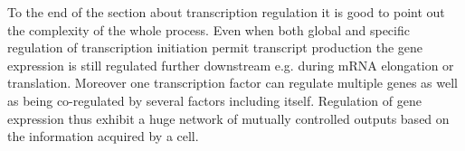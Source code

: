 To the end of the section about transcription regulation it is good to point out the complexity of the whole process.
Even when both global and specific regulation of transcription initiation permit transcript production the gene expression is still regulated further downstream e.g. during mRNA elongation or translation.
Moreover one transcription factor can regulate multiple genes as well as being co-regulated by several factors including itself.
Regulation of gene expression thus exhibit a huge network of mutually controlled outputs based on the information acquired by a cell.




